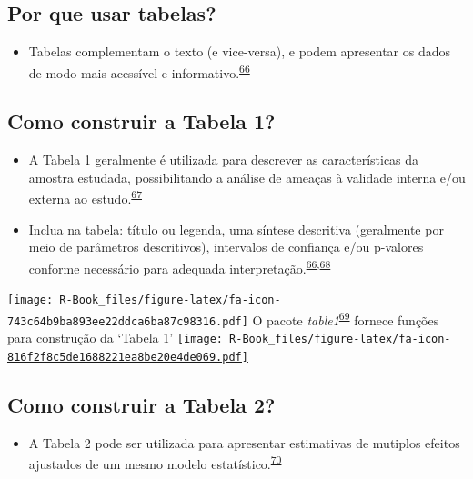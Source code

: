 \documentclass[
]{book}
\providecommand{\tightlist}{%
  \setlength{\itemsep}{0pt}\setlength{\parskip}{0pt}}
\begin{document}
\hypertarget{por-que-usar-tabelas}{%
\subsection{Por que usar tabelas?}\label{por-que-usar-tabelas}}

\begin{itemize}
\tightlist
\item
  Tabelas complementam o texto (e vice-versa), e podem apresentar os dados de modo mais acessível e informativo.\textsuperscript{\protect\hyperlink{ref-Inskip2017}{66}}
\end{itemize}

\hypertarget{como-construir-a-tabela-1}{%
\subsection{Como construir a Tabela 1?}\label{como-construir-a-tabela-1}}

\begin{itemize}
\item
  A Tabela 1 geralmente é utilizada para descrever as características da amostra estudada, possibilitando a análise de ameaças à validade interna e/ou externa ao estudo.\textsuperscript{\protect\hyperlink{ref-Hayes-Larson2019}{67}}
\item
  Inclua na tabela: título ou legenda, uma síntese descritiva (geralmente por meio de parâmetros descritivos), intervalos de confiança e/ou p-valores conforme necessário para adequada interpretação.\textsuperscript{\protect\hyperlink{ref-Inskip2017}{66},\protect\hyperlink{ref-Kwak2021}{68}}
\end{itemize}

\texttt{[image: R-Book\_files/figure-latex/fa-icon-743c64b9ba893ee22ddca6ba87c98316.pdf]} O pacote \emph{table1}\textsuperscript{\protect\hyperlink{ref-table1}{69}} fornece funções para construção da `Tabela 1' \href{https://cran.r-project.org/web/packages/table1/index.html}{\texttt{[image: R-Book\_files/figure-latex/fa-icon-816f2f8c5de1688221ea8be20e4de069.pdf]}}

\hypertarget{como-construir-a-tabela-2}{%
\subsection{Como construir a Tabela 2?}\label{como-construir-a-tabela-2}}

\begin{itemize}
\tightlist
\item
  A Tabela 2 pode ser utilizada para apresentar estimativas de mutiplos efeitos ajustados de um mesmo modelo estatístico.\textsuperscript{\protect\hyperlink{ref-Westreich2013}{70}}
\end{itemize}
\end{document}

